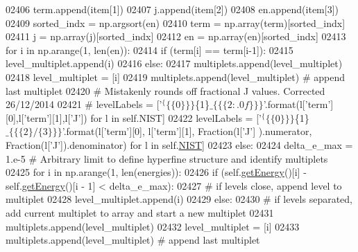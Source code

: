 \begin{DoxyCode}
{{{{{{{{{{{{{{{{{{{{{{02406                 term.append(item[1])
02407                 j.append(item[2])
02408                 en.append(item[3])
02409             sorted\_indx = np.argsort(en) 
02410             term = np.array(term)[sorted\_indx]
02411             j = np.array(j)[sorted\_indx]
02412             en = np.array(en)[sorted\_indx]
02413             \textcolor{keywordflow}{for} i \textcolor{keywordflow}{in} np.arange(1, len(en)):
02414                 \textcolor{keywordflow}{if} (term[i] == term[i-1]):
02415                     level\_multiplet.append(i)
02416                 \textcolor{keywordflow}{else}:
02417                     multiplets.append(level\_multiplet) 
02418                     level\_multiplet = [i]
02419             multiplets.append(level\_multiplet) \textcolor{comment}{# append last multiplet}
02420 \textcolor{comment}{# Mistakenly rounds off fractional J values. Corrected 26/12/2014            }
02421 \textcolor{comment}{#            levelLabels = ['$^\{\{\{0\}\}\}$\{1\}$\_\{\{\{2:.0f\}\}\}$'.format(l['term'][0],l['term'][1],l['J']) for l in
       self.NIST]}
02422             levelLabels = [\textcolor{stringliteral}{'$^\{\{\{0\}\}\}$\{1\}$\_\{\{\{2\}/\{3\}\}\}$'}.format(l[\textcolor{stringliteral}{'term'}][0], l[\textcolor{stringliteral}{'term'}][1], Fraction(l[\textcolor{stringliteral}{'J'}]
      ).numerator, Fraction(l[\textcolor{stringliteral}{'J'}]).denominator) \textcolor{keywordflow}{for} l \textcolor{keywordflow}{in} self.\hyperlink{classpyneb_1_1core_1_1pynebcore_1_1_atom_a65e03e79fb1cde1b00580042f3303538}{NIST}]
02423         \textcolor{keywordflow}{else}:
02424             delta\_e\_max = 1.e-5  \textcolor{comment}{# Arbitrary limit to define hyperfine structure and identify multiplets }
02425             \textcolor{keywordflow}{for} i \textcolor{keywordflow}{in} np.arange(1, len(energies)):
02426                 \textcolor{keywordflow}{if} (self.\hyperlink{classpyneb_1_1core_1_1pynebcore_1_1_atom_a9940acb2999e864edf9761d822e65d7f}{getEnergy}()[i] - self.\hyperlink{classpyneb_1_1core_1_1pynebcore_1_1_atom_a9940acb2999e864edf9761d822e65d7f}{getEnergy}()[i - 1] < delta\_e\_max):
02427                     \textcolor{comment}{# if levels close, append level to multiplet}
02428                     level\_multiplet.append(i) 
02429                 \textcolor{keywordflow}{else}:
02430                     \textcolor{comment}{# if levels separated, add current multiplet to array and start a new multiplet}
02431                     multiplets.append(level\_multiplet) 
02432                     level\_multiplet = [i]
02433             multiplets.append(level\_multiplet) \textcolor{comment}{# append last multiplet}
}}}}}}}}}}}}}}}}}}}}}}
\end{DoxyCode}
